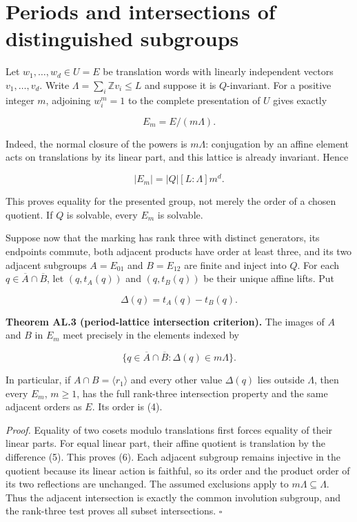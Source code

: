 \section{Periods and intersections of distinguished subgroups}\label{periods-and-intersections-of-distinguished-subgroups}

Let \(w_1,\ldots,w_d\in U=E\) be translation words with linearly independent
vectors \(v_1,\ldots,v_d\). Write
\(\Lambda=\sum_i\mathbb Z v_i\leq L\) and suppose it is \(Q\)-invariant.
For a positive integer \(m\), adjoining \(w_i^m=1\) to the complete
presentation of \(U\) gives exactly

\[ E_m=E/(m\Lambda).\tag{3}\]

Indeed, the normal closure of the powers is \(m\Lambda\): conjugation by
an affine element acts on translations by its linear part, and this
lattice is already invariant. Hence

\[ |E_m|=|Q|[L:\Lambda]m^d.\tag{4}\]

This proves equality for the presented group, not merely the order of a
chosen quotient. If \(Q\) is solvable, every \(E_m\) is solvable.

Suppose now that the marking has rank three with distinct generators,
its endpoints commute, both adjacent products have order at least three, and
its two adjacent subgroups \(A=E_{01}\) and \(B=E_{12}\) are finite and
inject into \(Q\). For each \(q\in\overline A\cap\overline B\), let
\((q,t_A(q))\) and \((q,t_B(q))\) be their unique affine lifts. Put

\[ \Delta(q)=t_A(q)-t_B(q).\tag{5} \]

\textbf{Theorem AL.3 (period-lattice intersection criterion).} The images of \(A\)
and \(B\) in \(E_m\) meet precisely in the elements indexed by

\[ \{q\in\overline A\cap\overline B:\Delta(q)\in m\Lambda\}.\tag{6}\]

In particular, if \(A\cap B=\langle r_1\rangle\) and every other value
\(\Delta(q)\) lies outside \(\Lambda\), then every \(E_m\), \(m\geq1\), has
the full rank-three intersection property and the same adjacent orders
as \(E\). Its order is (4).

\emph{Proof.} Equality of two cosets modulo translations first forces equality
of their linear parts. For equal linear part, their affine quotient is
translation by the difference (5). This proves (6). Each adjacent
subgroup remains injective in the quotient because its linear action is
faithful, so its order and the product order of its two reflections are
unchanged. The assumed exclusions apply to \(m\Lambda\subseteq\Lambda\).
Thus the adjacent intersection is exactly the common involution subgroup,
and the rank-three test proves all subset intersections. \(\square\)

